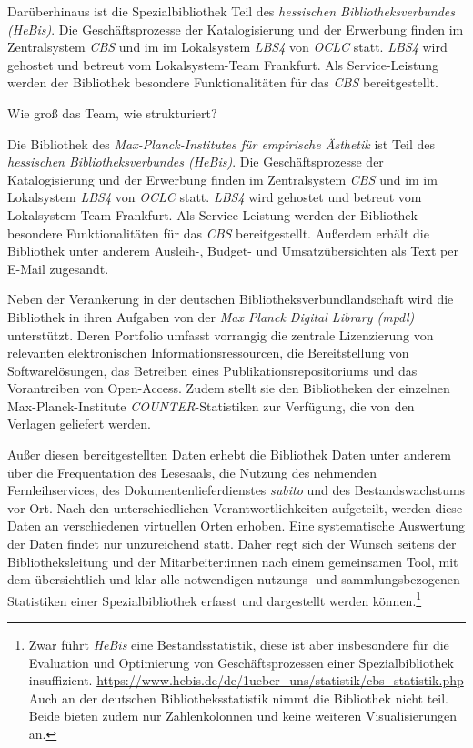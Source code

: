 Darüberhinaus ist die Spezialbibliothek Teil des \textit{hessischen Bibliotheksverbundes (HeBis)}. Die Geschäftsprozesse
der Katalogisierung und der Erwerbung finden im Zentralsystem \textit{CBS} und im im Lokalsystem \textit{LBS4} von
\textit{OCLC} statt. \textit{LBS4} wird gehostet und betreut vom Lokalsystem-Team Frankfurt. Als Service-Leistung werden der Bibliothek besondere Funktionalitäten
für das \textit{CBS} bereitgestellt.

Wie groß das Team, wie strukturiert?

\clearpage


Die Bibliothek des \textit{Max-Planck-Institutes für empirische Ästhetik}
ist Teil des \textit{hessischen Bibliotheksverbundes (HeBis)}. Die Geschäftsprozesse
der Katalogisierung und der Erwerbung finden im Zentralsystem \textit{CBS} und im im Lokalsystem \textit{LBS4} von
\textit{OCLC} statt. \textit{LBS4} wird gehostet und betreut vom Lokalsystem-Team Frankfurt. Als Service-Leistung werden der Bibliothek besondere Funktionalitäten
für das \textit{CBS} bereitgestellt. Außerdem erhält die Bibliothek unter anderem Ausleih-, Budget- und
Umsatzübersichten als Text per E-Mail zugesandt.


Neben der Verankerung in der deutschen Bibliotheksverbundlandschaft
wird die Bibliothek in ihren Aufgaben von der
\textit{Max Planck Digital Library (mpdl)}
unterstützt. Deren Portfolio umfasst vorrangig die zentrale Lizenzierung
von relevanten elektronischen Informationsressourcen, die Bereitstellung
von Softwarelösungen, das Betreiben eines Publikationsrepositoriums und
das Vorantreiben von Open-Access. Zudem stellt sie den Bibliotheken der einzelnen Max-Planck-Institute
\textit{COUNTER}-Statistiken zur Verfügung, die von den Verlagen geliefert werden.


Außer diesen bereitgestellten Daten erhebt die Bibliothek Daten unter anderem über
die Frequentation des Lesesaals, die Nutzung des nehmenden Fernleihservices, des
Dokumentenlieferdienstes \textit{subito} und des Bestandswachstums vor Ort.
Nach den unterschiedlichen Verantwortlichkeiten aufgeteilt, werden diese Daten an verschiedenen virtuellen Orten erhoben.
Eine systematische Auswertung der Daten findet nur unzureichend statt.
Daher regt sich der Wunsch seitens der Bibliotheksleitung und der Mitarbeiter:innen nach einem gemeinsamen Tool,
mit dem übersichtlich und klar alle notwendigen nutzungs- und sammlungsbezogenen Statistiken einer
Spezialbibliothek erfasst und dargestellt werden können.\footnote{Zwar führt \textit{HeBis} eine Bestandsstatistik, diese ist aber insbesondere für die
Evaluation und Optimierung von Geschäftsprozessen einer Spezialbibliothek
insuffizient. \url{https://www.hebis.de/de/1ueber_uns/statistik/cbs_statistik.php} 
Auch an der deutschen Bibliotheksstatistik nimmt die Bibliothek nicht teil. Beide bieten zudem nur Zahlenkolonnen und keine weiteren Visualisierungen an.}


